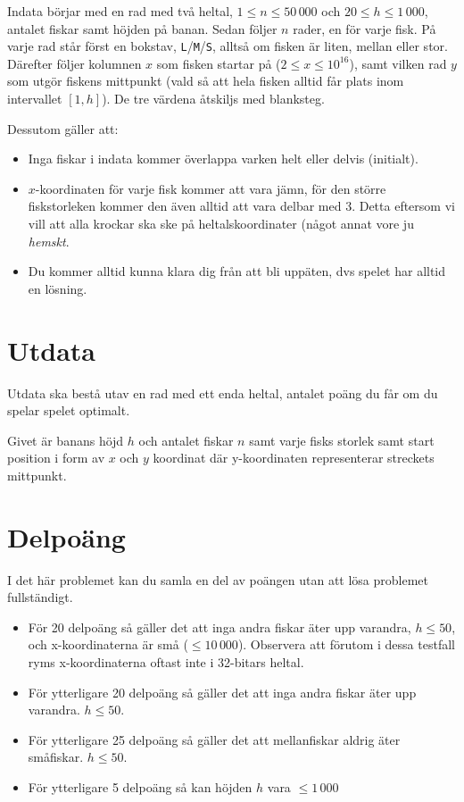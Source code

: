 Indata börjar med en rad med två heltal, $1 \leq n \leq 50\,000$ och $20 \leq
h \leq 1\,000$, antalet fiskar samt höjden på banan. Sedan följer $n$ rader,
en för varje fisk. På varje rad står först en bokstav, \texttt{L}/\texttt{M}/\texttt{S}, alltså om fisken är liten, mellan eller stor. Därefter följer kolumnen $x$ som fisken startar på ($2 \leq x \leq 10^{16}$), samt vilken rad $y$ som utgör fiskens mittpunkt (vald så att hela fisken alltid får plats inom intervallet $[1, h]$). De tre värdena åtskiljs med blanksteg.

Dessutom gäller att:
\begin{itemize}
  \item
    Inga fiskar i indata kommer överlappa varken helt eller delvis (initialt).
  \item
      $x$-koordinaten för varje fisk kommer att vara jämn, för den större
      fiskstorleken kommer den även alltid att vara delbar med 3. Detta
      eftersom vi vill att alla krockar ska ske på heltalskoordinater (något
      annat vore ju \emph{hemskt}.
  \item
    Du kommer alltid kunna klara dig från att bli uppäten, dvs spelet har
    alltid en lösning.
\end{itemize}

\section*{Utdata}
Utdata ska bestå utav en rad med ett enda heltal, antalet poäng du får om du spelar spelet optimalt.


Givet är banans höjd $h$ och antalet fiskar $n$ samt
varje fisks storlek samt start position i form av $x$ och $y$ koordinat där y-koordinaten
representerar streckets mittpunkt. 



\section*{Delpoäng}
I det här problemet kan du samla en del av poängen utan att lösa problemet fullständigt.

\begin{itemize}
    \item För 20 delpoäng så gäller det att inga andra fiskar äter upp
          varandra, $h \leq 50$, och x-koordinaterna är små ($\leq 10\,000$). Observera att förutom i dessa testfall ryms x-koordinaterna oftast inte i 32-bitars heltal.
    \item För ytterligare 20 delpoäng så gäller det att inga andra fiskar
          äter upp varandra. $h \leq 50$.
    \item För ytterligare 25 delpoäng så gäller det att mellanfiskar aldrig
          äter småfiskar. $h \leq 50$.
    \item För ytterligare 5 delpoäng så kan höjden $h$ vara $\leq 1\,000$
\end{itemize}

